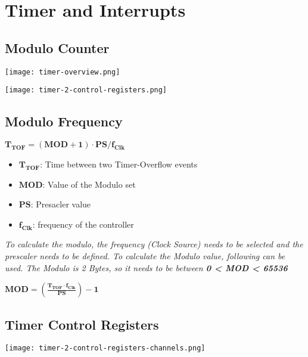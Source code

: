 \section{Timer and Interrupts}

\subsection{Modulo Counter}

\texttt{[image: timer-overview.png]}

\texttt{[image: timer-2-control-registers.png]}

\subsection{Modulo Frequency}

$\mathbf{T_{TOF} = (MOD + 1) \cdot PS / f_{Clk}}$
\newline
\begin{itemize}
    \item{$\mathbf{T_{TOF}}$: Time between two Timer-Overflow events}
    \item{$\mathbf{MOD}$: Value of the Modulo set}
    \item{$\mathbf{PS}$: Presacler value}
    \item{$\mathbf{f_{Clk}}$: frequency of the controller}
\end{itemize}

\textit{
    \newline
    To calculate the modulo, the frequency (Clock Source) needs to be selected
    and the prescaler needs to be defined. To calculate the Modulo value, following can
    be used. The Modulo is 2 Bytes, so it needs to be between \textbf{0 < MOD < 65536}
    \newline
}

$\mathbf{MOD = (\frac{T_{TOF} \cdot f_{Clk}}{PS}) - 1}$

\subsection{Timer Control Registers}

\texttt{[image: timer-2-control-registers-channels.png]}

